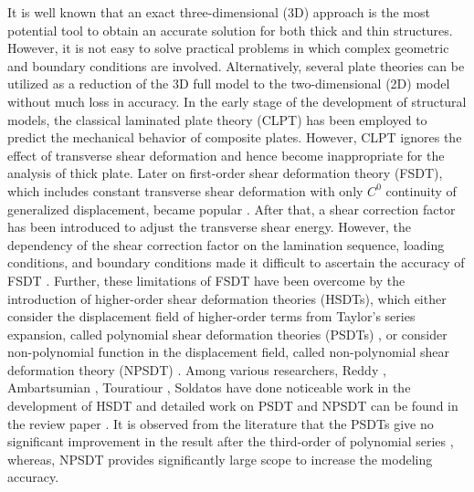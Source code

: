\documentclass[3p,preprint,12pt]{elsarticle}
\begin{document}
It is well known that an exact three-dimensional (3D) approach is the most potential tool to obtain an accurate solution for both thick and thin structures. However, it is not easy to solve practical problems in which complex geometric and boundary conditions are involved. Alternatively, several plate theories can be utilized as a reduction of the 3D full model to the two-dimensional (2D) model without much loss in accuracy. In the early stage of the development of structural models, the classical laminated plate theory (CLPT)  \cite{timoshenko1959theory} has been employed to predict the mechanical behavior of composite plates. However, CLPT ignores the effect of transverse shear deformation and hence become inappropriate for the analysis of thick plate. Later on first-order shear deformation theory (FSDT), which includes constant transverse shear deformation with only $C^0$ continuity of generalized displacement, became popular \cite{reissner1945effect}. After that, a shear correction factor has been introduced to adjust the transverse shear energy. However, the dependency of the shear correction factor on the lamination sequence, loading conditions, and boundary conditions made it difficult to ascertain the accuracy of FSDT \cite{pai1995new}. Further, these limitations of FSDT have been overcome by the introduction of higher-order shear deformation theories (HSDTs), which either consider  the displacement field of higher-order terms from Taylor's series expansion, called polynomial shear deformation theories (PSDTs)  \cite{levinson1980accurate, lo1977high, reddy1984simple}, or consider non-polynomial function in the displacement field, called non-polynomial shear deformation theory (NPSDT) \cite{ambartsumian1958theory,touratier1991efficient, Soldatos1992, mantari2011static, mantari2012new, Mantari2012, el2011new}. Among various researchers, Reddy \cite{reddy1984simple}, Ambartsumian \cite{ambartsumian1958theory}, Touratiour \cite{touratier1991efficient}, Soldatos \cite{Soldatos1992} have done noticeable work in the development of HSDT and detailed work on PSDT and NPSDT can be found in the review paper \cite{abrate2017equivalent}. It is observed from the literature that the PSDTs give no significant improvement in the result after the third-order of polynomial series \cite{ghugal2002review}, whereas, NPSDT provides significantly large scope to increase the modeling accuracy.
\end{document}
